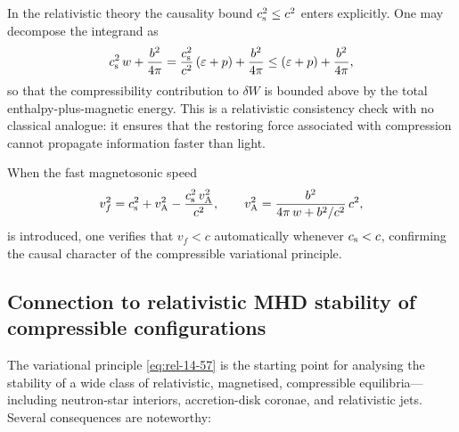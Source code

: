 In the relativistic theory the causality bound $c_{\mathrm{s}}^{2} \le c^{2}$
enters explicitly.  One may decompose the integrand as
\begin{equation}\label{eq:rel-14-decompose}
  c_{\mathrm{s}}^{2}\,w + \frac{b^{2}}{4\pi}
  = \frac{c_{\mathrm{s}}^{2}}{c^{2}}\,(\varepsilon + p)
    + \frac{b^{2}}{4\pi}
  \le (\varepsilon + p)
    + \frac{b^{2}}{4\pi},
\end{equation}
so that the compressibility contribution to $\delta W$ is bounded
above by the total enthalpy-plus-magnetic energy.  This is a
relativistic consistency check with no classical analogue: it ensures
that the restoring force associated with compression cannot
propagate information faster than light.

When the fast magnetosonic speed
\begin{equation}\label{eq:rel-14-vf}
  v_{f}^{2}
  = c_{\mathrm{s}}^{2} + v_{\mathrm{A}}^{2}
    - \frac{c_{\mathrm{s}}^{2}\,v_{\mathrm{A}}^{2}}{c^{2}},
  \qquad
  v_{\mathrm{A}}^{2}
  = \frac{b^{2}}{4\pi\,w + b^{2}/c^{2}}\,c^{2},
\end{equation}
is introduced, one verifies that $v_{f} < c$ automatically whenever
$c_{\mathrm{s}} < c$, confirming the causal character of the compressible
variational principle.

\subsection{Connection to relativistic MHD stability of compressible
  configurations}\label{sec:rel-123e}

The variational principle \eqref{eq:rel-14-57} is the starting point
for analysing the stability of a wide class of relativistic,
magnetised, compressible equilibria---including neutron-star
interiors, accretion-disk coronae, and relativistic jets.  Several
consequences are noteworthy:

